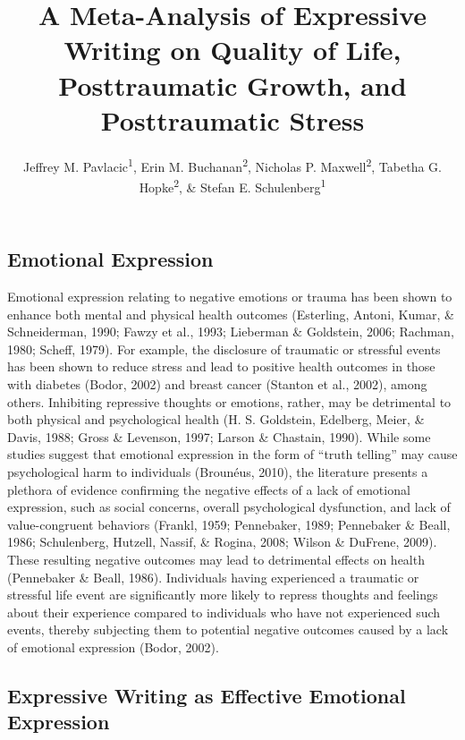 \documentclass[english,man, mask]{apa6}
\title{A Meta-Analysis of Expressive Writing on Quality of Life, Posttraumatic
Growth, and Posttraumatic Stress}
\author{Jeffrey M. Pavlacic\textsuperscript{1}, Erin M. Buchanan\textsuperscript{2}, Nicholas P. Maxwell\textsuperscript{2}, Tabetha G. Hopke\textsuperscript{2}, \& Stefan E. Schulenberg\textsuperscript{1}}
\affiliation{
    \vspace{0.5cm}
          \textsuperscript{1} University of Mississippi\\
          \textsuperscript{2} Missouri State University  }
\theoremstyle{definition}
\theoremstyle{definition}
\theoremstyle{definition}
\theoremstyle{remark}
\begin{document}
\maketitle

\setcounter{secnumdepth}{0}



\subsection{Emotional Expression}\label{emotional-expression}

Emotional expression relating to negative emotions or trauma has been
shown to enhance both mental and physical health outcomes (Esterling,
Antoni, Kumar, \& Schneiderman, 1990; Fawzy et al., 1993; Lieberman \&
Goldstein, 2006; Rachman, 1980; Scheff, 1979). For example, the
disclosure of traumatic or stressful events has been shown to reduce
stress and lead to positive health outcomes in those with diabetes
(Bodor, 2002) and breast cancer (Stanton et al., 2002), among others.
Inhibiting repressive thoughts or emotions, rather, may be detrimental
to both physical and psychological health (H. S. Goldstein, Edelberg,
Meier, \& Davis, 1988; Gross \& Levenson, 1997; Larson \& Chastain,
1990). While some studies suggest that emotional expression in the form
of \enquote{truth telling} may cause psychological harm to individuals
(Brounéus, 2010), the literature presents a plethora of evidence
confirming the negative effects of a lack of emotional expression, such
as social concerns, overall psychological dysfunction, and lack of
value-congruent behaviors (Frankl, 1959; Pennebaker, 1989; Pennebaker \&
Beall, 1986; Schulenberg, Hutzell, Nassif, \& Rogina, 2008; Wilson \&
DuFrene, 2009). These resulting negative outcomes may lead to
detrimental effects on health (Pennebaker \& Beall, 1986). Individuals
having experienced a traumatic or stressful life event are significantly
more likely to repress thoughts and feelings about their experience
compared to individuals who have not experienced such events, thereby
subjecting them to potential negative outcomes caused by a lack of
emotional expression (Bodor, 2002).

\subsection{Expressive Writing as Effective Emotional
Expression}\label{expressive-writing-as-effective-emotional-expression}
\end{document}
